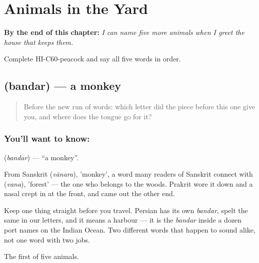 
\chapter{Animals in the Yard}
\label{ch:hi-animals-in-the-yard}

\begin{chapteropening}
\textbf{By the end of this chapter:} \emph{I can name five more animals when I greet the house that keeps them.}

Complete HI-C60-peacock and say all five words in order.
\end{chapteropening}

\section[\texorpdfstring{\hi{बंदर} (bandar)}{बंदर (bandar)}]{ (bandar) — a monkey}

\label{lesson:HI-C60-monkey}



\begin{quote}
Before the new run of words: which letter did the piece before this one give you, and where does the tongue go for it?
\end{quote}

\subsection*{You'll want to know: }
\textbf{} (\emph{bandar}) — \textquotedblleft{}a monkey\textquotedblright{}.

From Sanskrit  (\emph{vānara}), 'monkey', a word many readers of Sanskrit connect with  (\emph{vana}), 'forest' — the one who belongs to the woods. Prakrit wore it down and a nasal crept in at the front, and  came out the other end.

Keep one thing straight before you travel. Persian has its own \emph{bandar}, spelt the same in our letters, and it means a harbour — it is the \emph{bandar} inside a dozen port names on the Indian Ocean. Two different words that happen to sound alike, not one word with two jobs.

\begin{grammarlens}[title={What you've built}]
The first of five animals.
\end{grammarlens}

